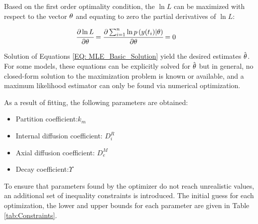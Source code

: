 \documentclass[../Article_Model_Parameters.tex]{subfiles}
\begin{document}
	Based on the first order optimality condition, the $\ln L$ can be maximized with respect to the vector ${\color{black} \theta}$ and equating to zero the partial derivatives of $\ln L$:
	
	{\footnotesize
		\begin{align}\label{EQ: MLE_Basic_Solution}
			\cfrac{\partial \ln L}{\partial {\color{black} \theta}} &= \cfrac{\partial \sum_{i=1}^{n} \ln p\left( {\color{black}y}(t_i) | {\color{black} \theta} \right) }{\partial {\color{black} \theta}} = 0 
	\end{align} }
	
	Solution of Equations \ref{EQ: MLE_Basic_Solution} yield the desired estimates $\hat{{\color{black} \theta}}$. For some models, these equations can be explicitly solved for $\hat{{\color{black} \theta}}$ but in general, no closed-form solution to the maximization problem is known or available, and a maximum likelihood estimator can only be found via numerical optimization.
	
	As a result of fitting, the following parameters are obtained:
	
	\begin{itemize}
		\item Partition coefficient:\qquad\quad\qquad$k_m$
		\item Internal diffusion coefficient: \quad$D_i^R$
		\item Axial diffusion coefficient: \qquad$D_e^M$
		\item Decay coefficient:\qquad\qquad\qquad$\Upsilon$
	\end{itemize}
	
	To ensure that parameters found by the optimizer do not reach unrealistic values, an additional set of inequality constraints is introduced. The initial guess for each optimization, the lower and upper bounds for each parameter are given in Table \ref{tab:Constraints}. 
 	
 	\begin{table}[h]
		\caption{Constraints and initial guess}
		\label{tab:Constraints}
	\end{table}
	
\end{document}
